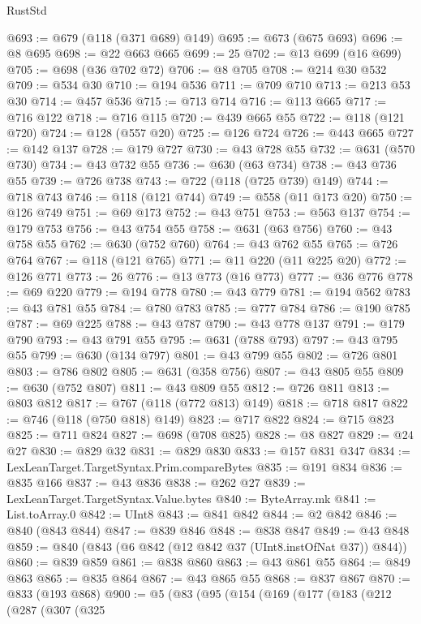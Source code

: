 \begin{lexlean}{RustStd}
\begin{coremodule}
@693 := @679 (@118 (@371 @689) @149)
@695 := @673 (@675 @693)
@696 := @8 @695
@698 := @22 @663 @665
@699 := 25
@702 := @13 @699 (@16 @699)
@705 := @698 (@36 @702 @72)
@706 := @8 @705
@708 := @214 @30 @532
@709 := @534 @30
@710 := @194 @536
@711 := @709 @710
@713 := @213 @53 @30
@714 := @457 @536
@715 := @713 @714
@716 := @113 @665
@717 := @716 @122
@718 := @716 @115
@720 := @439 @665 @55
@722 := @118 (@121 @720)
@724 := @128 (@557 @20)
@725 := @126 @724
@726 := @443 @665
@727 := @142 @137
@728 := @179 @727
@730 := @43 @728 @55
@732 := @631 (@570 @730)
@734 := @43 @732 @55
@736 := @630 (@63 @734)
@738 := @43 @736 @55
@739 := @726 @738
@743 := @722 (@118 (@725 @739) @149)
@744 := @718 @743
@746 := @118 (@121 @744)
@749 := @558 (@11 @173 @20)
@750 := @126 @749
@751 := @69 @173
@752 := @43 @751
@753 := @563 @137
@754 := @179 @753
@756 := @43 @754 @55
@758 := @631 (@63 @756)
@760 := @43 @758 @55
@762 := @630 (@752 @760)
@764 := @43 @762 @55
@765 := @726 @764
@767 := @118 (@121 @765)
@771 := @11 @220 (@11 @225 @20)
@772 := @126 @771
@773 := 26
@776 := @13 @773 (@16 @773)
@777 := @36 @776
@778 := @69 @220
@779 := @194 @778
@780 := @43 @779
@781 := @194 @562
@783 := @43 @781 @55
@784 := @780 @783
@785 := @777 @784
@786 := @190 @785
@787 := @69 @225
@788 := @43 @787
@790 := @43 @778 @137
@791 := @179 @790
@793 := @43 @791 @55
@795 := @631 (@788 @793)
@797 := @43 @795 @55
@799 := @630 (@134 @797)
@801 := @43 @799 @55
@802 := @726 @801
@803 := @786 @802
@805 := @631 (@358 @756)
@807 := @43 @805 @55
@809 := @630 (@752 @807)
@811 := @43 @809 @55
@812 := @726 @811
@813 := @803 @812
@817 := @767 (@118 (@772 @813) @149)
@818 := @718 @817
@822 := @746 (@118 (@750 @818) @149)
@823 := @717 @822
@824 := @715 @823
@825 := @711 @824
@827 := @698 (@708 @825)
@828 := @8 @827
@829 := @24 @27
@830 := @829 @32
@831 := @829 @830
@833 := @157 @831 @347
@834 := LexLeanTarget.TargetSyntax.Prim.compareBytes
@835 := @191 @834
@836 := @835 @166
@837 := @43 @836
@838 := @262 @27
@839 := LexLeanTarget.TargetSyntax.Value.bytes
@840 := ByteArray.mk
@841 := List.toArray.{0}
@842 := UInt8
@843 := @841 @842
@844 := @2 @842
@846 := @840 (@843 @844)
@847 := @839 @846
@848 := @838 @847
@849 := @43 @848
@859 := @840 (@843 (@6 @842 (@12 @842 @37 (UInt8.instOfNat @37)) @844))
@860 := @839 @859
@861 := @838 @860
@863 := @43 @861 @55
@864 := @849 @863
@865 := @835 @864
@867 := @43 @865 @55
@868 := @837 @867
@870 := @833 (@193 @868)
@900 := @5
    (@83
      (@95
        (@154
          (@169
            (@177
              (@183
                (@212
                  (@287
                    (@307
                      (@325

\end{coremodule}
\end{lexlean}
